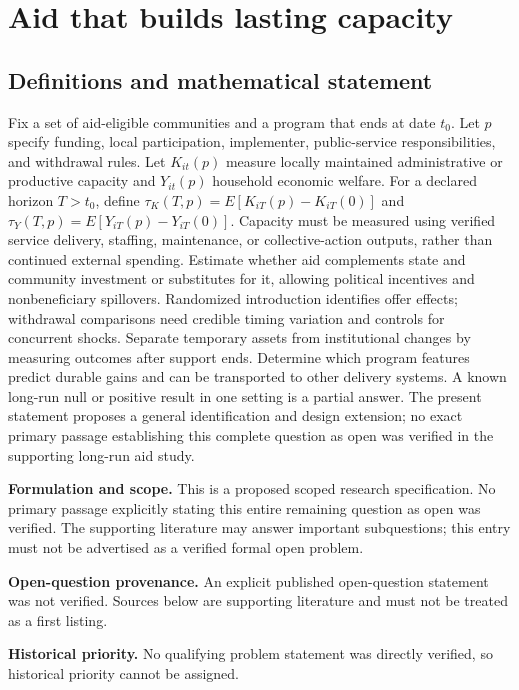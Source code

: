 \documentclass[11pt]{article}
\begin{document}
\section*{Aid that builds lasting capacity}\label{30007657}
\subsection{Definitions and mathematical statement}
Fix a set of aid-eligible communities and a program that ends at date \(t_0\). Let \(p\) specify funding, local participation, implementer, public-service responsibilities, and withdrawal rules. Let \(K_{it}(p)\) measure locally maintained administrative or productive capacity and \(Y_{it}(p)\) household economic welfare. For a declared horizon \(T>t_0\), define \(\tau_K(T,p)=E[K_{iT}(p)-K_{iT}(0)]\) and \(\tau_Y(T,p)=E[Y_{iT}(p)-Y_{iT}(0)]\). Capacity must be measured using verified service delivery, staffing, maintenance, or collective-action outputs, rather than continued external spending. Estimate whether aid complements state and community investment or substitutes for it, allowing political incentives and nonbeneficiary spillovers. Randomized introduction identifies offer effects; withdrawal comparisons need credible timing variation and controls for concurrent shocks. Separate temporary assets from institutional changes by measuring outcomes after support ends. Determine which program features predict durable gains and can be transported to other delivery systems. A known long-run null or positive result in one setting is a partial answer. The present statement proposes a general identification and design extension; no exact primary passage establishing this complete question as open was verified in the supporting long-run aid study.

\par\textbf{Formulation and scope.} This is a proposed scoped research specification. No primary passage explicitly stating this entire remaining question as open was verified. The supporting literature may answer important subquestions; this entry must not be advertised as a verified formal open problem.

\par\textbf{Open-question provenance.} An explicit published open-question statement was not verified. Sources below are supporting literature and must not be treated as a first listing.

\par\textbf{Historical priority.} No qualifying problem statement was directly verified, so historical priority cannot be assigned.
\end{document}
